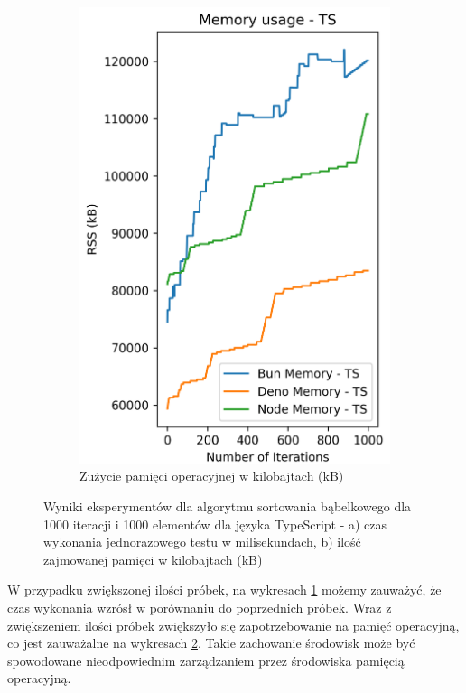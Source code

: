 \begin{figure}[H]
\begin{subfigure}[b]{0.42\textwidth}
    \label{fig:bubble_sorting_e2_ts_time}
  \end{subfigure}
  \begin{subfigure}[b]{0.42\textwidth}
    \centering
    \includegraphics[width=\textwidth]{Figures/sorting/sorting_bubble_1000_1000_ts_memory.png}
    \caption{Zużycie pamięci operacyjnej w kilobajtach (kB)}
    \label{fig:bubble_sorting_e2_ts_memory}
  \end{subfigure}
  \caption{Wyniki eksperymentów dla algorytmu sortowania bąbelkowego dla 1000 iteracji i 1000 elementów dla języka TypeScript - a) czas wykonania jednorazowego testu w milisekundach, b) ilość zajmowanej pamięci w kilobajtach (kB)}
  \label{fig:bubble_sorting_e2_ts}
\end{figure}

W przypadku zwiększonej ilości próbek, na wykresach \ref{fig:bubble_sorting_e2_ts_time} możemy zauważyć, że czas wykonania wzrósł w porównaniu do poprzednich próbek. Wraz z zwiększeniem ilości próbek zwiększyło się zapotrzebowanie na pamięć operacyjną, co jest zauważalne na wykresach \ref{fig:bubble_sorting_e2_ts_memory}. Takie zachowanie środowisk może być spowodowane nieodpowiednim zarządzaniem przez środowiska pamięcią operacyjną.

